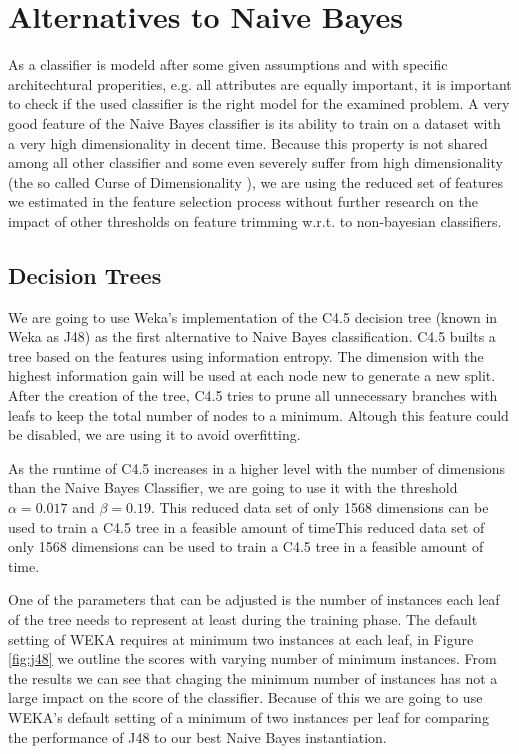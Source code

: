 \section{Alternatives to Naive Bayes}
As a classifier is modeld after some given assumptions and with specific architechtural properities, e.g. all attributes are equally important, it is important to check if the used classifier is the right model for the examined problem.
A very good feature of the Naive Bayes classifier is its ability to train on a dataset with a very high dimensionality in decent time.
Because this property is not shared among all other classifier and some even severely suffer from high dimensionality (the so called Curse of Dimensionality \cite{bellman1957dynamic}), we are using the reduced set of features we estimated in the feature selection process without further research on the impact of other thresholds on feature trimming w.r.t. to non-bayesian classifiers.

\subsection{Decision Trees}

We are going to use Weka's \cite{hall2009weka} implementation of the C4.5 decision tree \cite{Quinlan1993} (known in Weka as J48) as the first alternative to Naive Bayes classification.
C4.5 builts a tree based on the features using information entropy.
The dimension with the highest information gain will be used at each node new to generate a new split.
After the creation of the tree, C4.5 tries to prune all unnecessary branches with leafs to keep the total number of nodes to a minimum.
Altough this feature could be disabled, we are using it to avoid overfitting.

As the runtime of C4.5 increases in a higher level with the number of dimensions than the Naive Bayes Classifier, we are going to use it with the threshold $\alpha=0.017$ and $\beta=0.19$.
This reduced data set of only 1568 dimensions can be used to train a C4.5 tree in a feasible amount of timeThis reduced data set of only 1568 dimensions can be used to train a C4.5 tree in a feasible amount of time.



One of the parameters that can be adjusted is the number of instances each leaf of the tree needs to represent at least during the training phase.
The default setting of WEKA requires at minimum two instances at each leaf, in Figure \ref{fig:j48} we outline the scores with varying number of minimum instances.
From the results we can see that chaging the minimum number of instances has not a large impact on the score of the classifier.
Because of this we are going to use WEKA's default setting of a minimum of two instances per leaf for comparing the performance of J48 to our best Naive Bayes instantiation.

